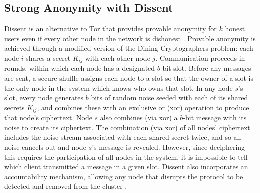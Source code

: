   \subsection{Strong Anonymity with Dissent}
    Dissent is an alternative to Tor that provides provable anonymity for $k$
    honest users even if every other node in the network is dishonest
    \cite{p2pd}.  Provable anonymity is achieved through a modified version of
    the Dining Cryptographers problem\cite{chaum_dining_1988}: each node $i$
    shares a secret $K_{ij}$ with each other node $j$. Communication proceeds in
    rounds, within which each node has a designated $b$-bit slot.  Before any
    messages are sent, a secure shuffle\cite{neff} assigns each node to a slot
    so that the owner of a slot is the only node in the system which knows who
    owns that slot.  In any node $s$'s slot, every node generates $b$ bits of
    random noise seeded with each of its shared secrets $K_{ij}$, and combines
    these with an exclusive or (xor) operation to produce that node's
    ciphertext. Node $s$ also combines (via xor) a $b$-bit message with its
    noise to create its ciphertext. The combination (via xor) of all nodes'
    ciphertext includes the noise stream associated with each shared secret
    twice, and so all noise cancels out and node $s$'s message is revealed.
    However, since deciphering this requires the participation of all nodes in
    the system, it is impossible to tell which client transmitted a message in a
    given slot. Dissent also incorporates an accountability mechanism, allowing
    any node that disrupts the protocol to be detected and removed from the
    cluster \cite{verdict}.

